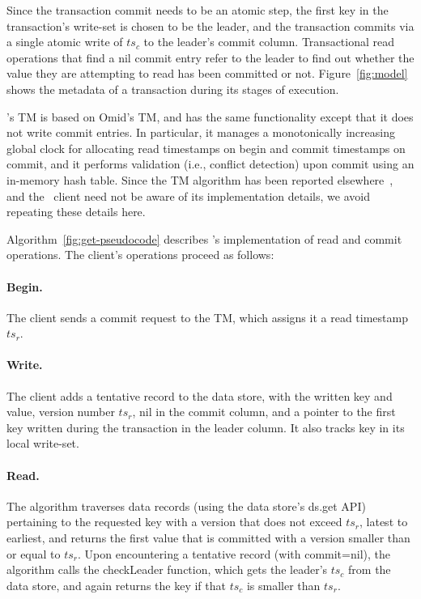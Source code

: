 Since the transaction commit needs to be an atomic step, the first key in the transaction's write-set is chosen to be the leader, and the transaction commits via a single atomic write of $ts_c$ to the leader's commit column. Transactional read operations that find a nil commit entry 
refer to the leader to find out whether the value they are attempting to read has been committed or not.
Figure~\ref{fig:model} shows the metadata of a transaction during its stages of execution. 

\sys's TM is based on Omid's TM, and has the same functionality except that it does not write commit entries.
In particular, it manages a monotonically increasing global clock for allocating read timestamps on begin and commit timestamps on commit,
and it performs validation (i.e., conflict detection) upon commit using an in-memory hash table. 
Since the TM algorithm has been reported elsewhere~\cite{Omid2017}, and the \sys\ client need not be aware of 
its implementation details, we avoid repeating these details here. 

Algorithm~\ref{fig:get-pseudocode} describes \sys's implementation of read and commit operations.
The client's operations proceed as follows:

\paragraph{Begin.}
The client sends a commit request to the TM, which assigns it a read timestamp $ts_r$.

\paragraph{Write.}
The client adds a tentative record to the data store, with the written key and value, version number $ts_r$, 
nil in the commit column, and a pointer to the first key written during the transaction in the leader column.
It also tracks key in its local write-set.


\paragraph{Read.}
The algorithm traverses data  records (using the data store's ds.get API) pertaining
to the requested key with a version that does not exceed $ts_r$, latest to earliest, and returns the first value that is committed
with a  version smaller than or equal to $ts_r$. Upon
encountering a tentative record (with commit=nil), the algorithm calls the {\sc checkLeader} function, which
gets the leader's $ts_c$ from the data store, and again returns the key if that $ts_c$ is smaller than $ts_r$. 

